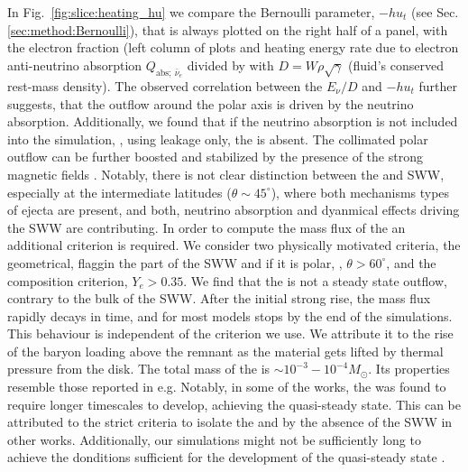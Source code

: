 In Fig.~\ref{fig:slice:heating_hu} we compare the Bernoulli parameter, 
$-hu_t$ (see Sec.\ref{sec:method:Bernoulli}), that is always plotted 
on the right half of a panel, with the electron fraction (left 
column of plots and heating energy rate due to electron anti-neutrino absorption 
$Q_{\text{abs};\:\bar{\nu}_e}$ divided by with $D=W\rho\sqrt{\gamma}$ 
(fluid's conserved rest-mass density).
The observed correlation between the $E_\nu/D$  and $-h u_t$ further suggests, 
that the outflow around the polar axis is driven by the neutrino absorption. 
Additionally, we found that if the neutrino absorption is not included into the 
simulation, \eg, using leakage only, the \nwind{} is absent. 
The collimated polar outflow can be further boosted and stabilized by the presence of the 
strong magnetic fields \citep{Bucciantini:2011kx,Ciolfi:2020hgg,Mosta:2020hlh}.
Notably, there is not clear distinction between the \nwind{} and \ac{SWW}, especially 
at the intermediate latitudes ($\theta \sim 45^{\circ}$), where both mechanisms types of 
ejecta are present, and both, neutrino absorption and dyanmical effects driving the \ac{SWW} 
are contributing. 
In order to compute the mass flux of the \nwind{} an additional criterion is required. 
We consider two physically motivated criteria, the geometrical, flaggin the part of the \ac{SWW} 
and \nwind{} if it is polar, \ie, $\theta>60^{\circ}$, and the composition criterion, $Y_e > 0.35$.
We find that the \nwind{} is not a steady state outflow, contrary to the bulk of the \ac{SWW}.
After the initial strong rise, the mass flux rapidly decays in time, and for most models stops 
by the end of the simulations. This behaviour is independent of the criterion we use. 
We attribute it to the rise of the baryon loading above the remnant as the material gets lifted 
by thermal pressure from the disk.
The total mass of the \nwind{} is ${\sim}10^{-3}-10^{-4}M_{\odot}$. Its properties resemble those 
reported in e.g. \citet{Dessart:2008zd,Perego:2014fma,Fujibayashi:2020dvr}
Notably, in some of the works, the \nwind{} was found to require longer timescales to develop, 
achieving the quasi-steady state. 
This can be attributed to the strict criteria to isolate the \nwind{} and by the absence of the 
\ac{SWW} in other works. 
Additionally, our simulations might not be sufficiently long to achieve the donditions 
sufficient for the development of the quasi-steady state \nwind{}.



